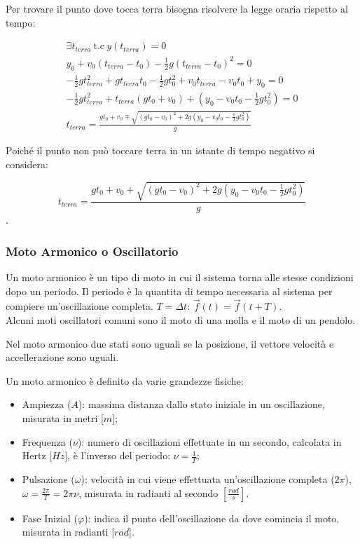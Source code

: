 \documentclass{article}
\numberwithin{equation}{subsection}
\begin{document}
Per trovare il punto dove tocca terra bisogna risolvere 
la legge oraria rispetto al tempo:

\begin{gather*}
    \exists t_{terra}\:\mbox{t.c}\: y(t_{terra}) = 0\\
    y_0 + v_0(t_{terra} - t_0)-\displaystyle\frac{1}{2}g
    (t_{terra} - t_0)^{2} = 0\\
    -\displaystyle\frac{1}{2}gt_{terra}^{2} + gt_{terra}t_0
    -\displaystyle\frac{1}{2}gt_0^{2}+v_0t_{terra} - v_0t_0 +y_0 =0\\
    -\displaystyle\frac{1}{2}gt_{terra}^{2}+t_{terra}
    (gt_0+v_0) + \left(y_0-v_0t_0 
    -\displaystyle\frac{1}{2}gt_0^{2}\right)=0\\
    t_{terra} = \displaystyle\frac{gt_0+v_0 \mp\sqrt{(gt_0-v_0)^{2}+2g\left(y_0-v_0t_0-\displaystyle\frac{1}{2}gt_0^{2}\right)}}{g}
\end{gather*}

Poiché il punto non può toccare terra in un istante di tempo 
negativo si considera:

\begin{equation}
    t_{terra} = \displaystyle\frac{gt_0+v_0 +\sqrt{(gt_0-v_0)^{2}+2g\left(y_0-v_0t_0-\displaystyle\frac{1}{2}gt_0^{2}\right)}}{g}
\end{equation}.

\subsubsection{Moto Armonico o Oscillatorio}
Un moto armonico è un tipo di moto in cui il sistema torna 
alle stesse condizioni dopo un periodo.
Il periodo è la quantita di tempo necessaria 
al sistema per compiere un'oscillazione completa.
$T = \Delta t$: $\vec{f}(t) = \vec{f}(t + T)$.\\

Alcuni moti oscillatori comuni sono il moto di una molla e il 
moto di un pendolo.

Nel moto armonico due stati sono uguali se la posizione, 
il vettore velocità e accellerazione sono uguali.

Un moto armonico è definito da varie grandezze fisiche:

\begin{itemize}
    \item Ampiezza ($A$): massima distanza dallo stato iniziale 
    in un oscillazione, misurata in metri [$m$];
    \item Frequenza ($\nu$): numero di oscillazioni effettuate 
    in un secondo, calcolata in Hertz [$Hz$], è l'inverso del 
    periodo: $\nu = \displaystyle\frac{1}{T}$;
    \item Pulsazione ($\omega$): velocità in cui viene 
    effettuata un'oscillazione completa ($2\pi$), $\omega = \displaystyle\frac{2\pi}{T} = 2\pi\nu$, 
    misurata in radianti al secondo $\left[\displaystyle\frac{rad}{s}\right]$.
    \item Fase Inizial ($\varphi$): indica il punto dell'oscillazione 
    da dove comincia il moto, misurata in radianti [$rad$].
\end{itemize}
\end{document}
